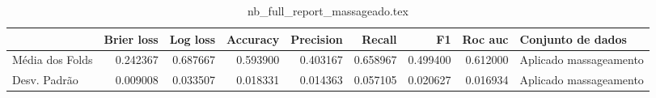\begin{table}
\centering
\caption{nb_full_report_massageado.tex}
\label{nb_full_report_massageado.tex}
\begin{tabular}{lrrrrrrrl}
\toprule
{} &  Brier  loss &  Log loss &  Accuracy  &  Precision  &   Recall  &       F1  &  Roc auc  &       Conjunto de dados \\
\midrule
Média dos Folds &     0.242367 &  0.687667 &   0.593900 &    0.403167 &  0.658967 &  0.499400 &  0.612000 &  Aplicado massageamento \\
Desv. Padrão    &     0.009008 &  0.033507 &   0.018331 &    0.014363 &  0.057105 &  0.020627 &  0.016934 &  Aplicado massageamento \\
\bottomrule
\end{tabular}
\end{table}
